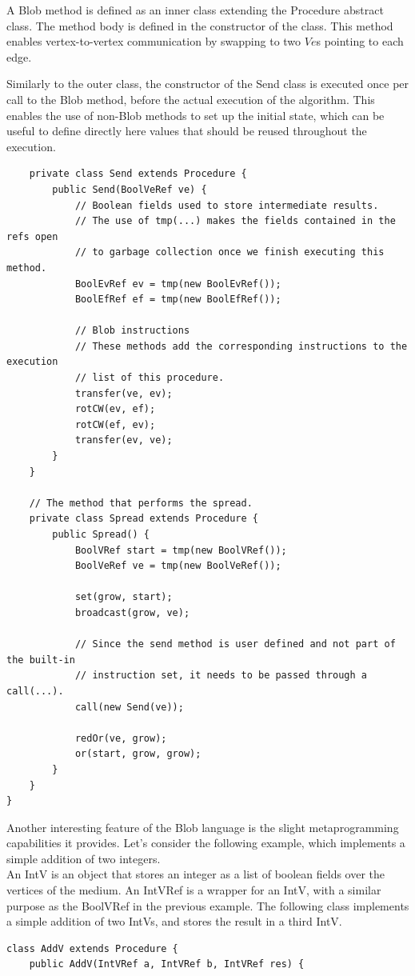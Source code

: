 \documentclass[11pt,a4paper]{report}
\begin{document}
A Blob method is defined as an inner class extending the Procedure abstract class.
The method body is defined in the constructor of the class.
This method enables vertex-to-vertex communication by swapping to two $Ve$s pointing to each edge.

Similarly to the outer class, the constructor of the Send class is executed once per call to the Blob method, before the actual execution of the algorithm. This enables the use of non-Blob methods to set up the initial state, which can be useful to define directly here values that should be reused throughout the execution.
\begin{verbatim}
    private class Send extends Procedure {
        public Send(BoolVeRef ve) {
            // Boolean fields used to store intermediate results.
            // The use of tmp(...) makes the fields contained in the refs open
            // to garbage collection once we finish executing this method.
            BoolEvRef ev = tmp(new BoolEvRef());
            BoolEfRef ef = tmp(new BoolEfRef());
            
            // Blob instructions
            // These methods add the corresponding instructions to the execution
            // list of this procedure. 
            transfer(ve, ev);
            rotCW(ev, ef);
            rotCW(ef, ev);
            transfer(ev, ve);
        }
    }
    
    // The method that performs the spread.
    private class Spread extends Procedure {
        public Spread() {
            BoolVRef start = tmp(new BoolVRef());
            BoolVeRef ve = tmp(new BoolVeRef());
            
            set(grow, start);
            broadcast(grow, ve);
            
            // Since the send method is user defined and not part of the built-in
            // instruction set, it needs to be passed through a call(...).
            call(new Send(ve));
            
            redOr(ve, grow);
            or(start, grow, grow);
        }
    }
}
\end{verbatim}

Another interesting feature of the Blob language is the slight metaprogramming capabilities it provides. Let's consider the following example, which implements a simple addition of two integers.\\

An IntV is an object that stores an integer as a list of boolean fields over the vertices of the medium. An IntVRef is a wrapper for an IntV, with a similar purpose as the BoolVRef in the previous example. The following class implements a simple addition of two IntVs, and stores the result in a third IntV.
\begin{verbatim}
class AddV extends Procedure {
    public AddV(IntVRef a, IntVRef b, IntVRef res) {
\end{verbatim}
\end{document}
